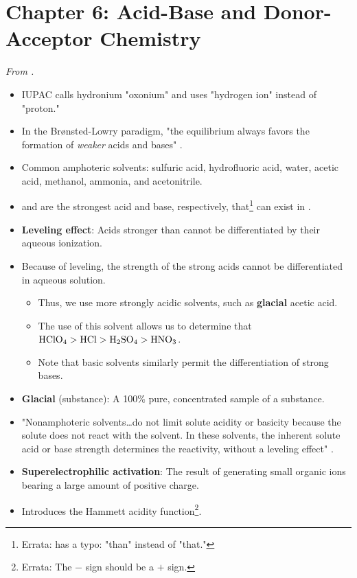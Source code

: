 \documentclass[../notes.tex]{subfiles}
\begin{document}
\section{Chapter 6: Acid-Base and Donor-Acceptor Chemistry}
\emph{From \textcite{bib:MiesslerFischerTarr}.}
\begin{itemize}
    \item IUPAC calls hydronium "oxonium" and uses "hydrogen ion" instead of "proton."
    \item In the Br{\o}nsted-Lowry paradigm, "the equilibrium always favors the formation of \emph{weaker} acids and bases" \parencite[171]{bib:MiesslerFischerTarr}.
    \item Common amphoteric solvents: sulfuric acid, hydrofluoric acid, water, acetic acid, methanol, ammonia, and acetonitrile.
    \item {} and  are the strongest acid and base, respectively, that\footnote{Errata: \textcite[173]{bib:MiesslerFischerTarr} has a typo: "than" instead of "that."} can exist in .
    \item \textbf{Leveling effect}: Acids stronger than  cannot be differentiated by their aqueous ionization.
    \item Because of leveling, the strength of the strong acids cannot be differentiated in aqueous solution.
    \begin{itemize}
        \item Thus, we use more strongly acidic solvents, such as \textbf{glacial} acetic acid.
        \item The use of this solvent allows us to determine that $\ce{HClO4}>\ce{HCl}>\ce{H2SO4}>\ce{HNO3}$.
        \item Note that basic solvents similarly permit the differentiation of strong bases.
    \end{itemize}
    \item \textbf{Glacial} (substance): A 100\% pure, concentrated sample of a substance.
    \item "Nonamphoteric solvents\dots do not limit solute acidity or basicity because the solute does not react with the solvent. In these solvents, the inherent solute acid or base strength determines the reactivity, without a leveling effect" \parencite[173]{bib:MiesslerFischerTarr}.
    \item \textbf{Superelectrophilic activation}: The result of generating small organic ions bearing a large amount of positive charge.
    \item Introduces the Hammett acidity function\footnote{Errata: The $-$ sign should be a $+$ sign.}.

\end{itemize}
\end{document}

